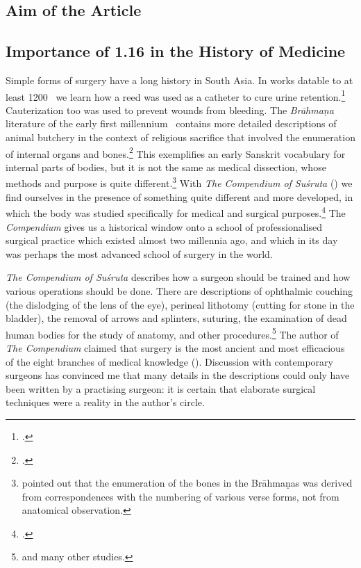 
\subsection{Aim of the Article}

\subsection{Importance of 1.16 in the History of Medicine}


Simple forms of surgery have a long history in South Asia. In works datable to at
least 1200 \BC\ we learn how a reed was used as a catheter to cure urine
retention.\footcite[70--71]{zysk-1985} Cauterization too was used to prevent
wounds from bleeding. The \emph{Brāhmaṇa} literature of the early first 
millennium
\BC\ contains more detailed descriptions of animal butchery in the context of
religious sacrifice that involved the enumeration of internal organs and
bones.\footcite{mala-1996}   This exemplifies an early Sanskrit vocabulary for
internal parts of bodies, but it is not the same as medical dissection, whose
methods and purpose is quite different.\footnote{\citet{keit-1908} pointed out
that the enumeration of the bones in the Brāhmaṇas was derived from
correspondences with the numbering of various verse forms, not from anatomical
observation.}  With \emph{The Compendium of Suśruta} (\SS) we find ourselves 
in
the presence of something quite different and more developed, in which the body
was studied specifically for medical and surgical purposes.\footcite{zysk-1986} 
The \emph{Compendium} gives us a historical window onto a school of
professionalised surgical practice which existed almost two millennia ago, and
which in its day was perhaps the most advanced school of surgery in the world.



\emph{The Compendium of Suśruta} describes how a surgeon should be trained 
and how
various operations should be done.  There are descriptions of ophthalmic couching
(the dislodging of the lens of the eye), perineal lithotomy (cutting for stone in
the bladder), the removal of arrows and splinters, suturing, the examination of
dead human bodies for the study of anatomy, and other
procedures.\footnote{\cites{mukh-1913,desh-2000,nara-2011,wuja-2003,wils-1823}
 and
many other studies.} The author of \emph{The Compendium} claimed that 
surgery is
the most ancient and most efficacious of the eight branches of medical knowledge
(). Discussion with contemporary surgeons has convinced me 
that
many details in the descriptions could only have been written by a practising
surgeon: it is certain that elaborate surgical techniques were a reality in
the author's circle.

